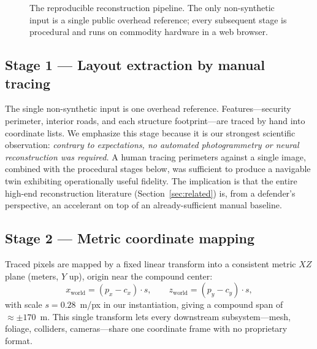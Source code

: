 \documentclass[conference]{IEEEtran}
\begin{document}
\begin{figure}[t]
\centering
{}
\caption{The reproducible reconstruction pipeline. The only non-synthetic input is
a single public overhead reference; every subsequent stage is procedural and
runs on commodity hardware in a web browser.}
\label{fig:pipeline}
\end{figure}

\subsection{Stage 1 --- Layout extraction by manual tracing}
The single non-synthetic input is one overhead reference. Features---security
perimeter, interior roads, and each structure footprint---are traced by hand into
coordinate lists. We emphasize this stage because it is our strongest scientific
observation: \emph{contrary to expectations, no automated photogrammetry or neural
reconstruction was required.} A human tracing perimeters against a single image,
combined with the procedural stages below, was sufficient to produce a navigable
twin exhibiting operationally useful fidelity. The implication is that the entire
high-end reconstruction literature (Section~\ref{sec:related}) is, from a
defender's perspective, an accelerant on top of an already-sufficient manual
baseline.

\subsection{Stage 2 --- Metric coordinate mapping}
Traced pixels are mapped by a fixed linear transform into a consistent metric
$XZ$ plane (meters, $Y$ up), origin near the compound center:
\[
x_{\text{world}} = (p_x - c_x)\cdot s, \qquad
z_{\text{world}} = (p_y - c_y)\cdot s ,
\]
with scale $s = 0.28$~m/px in our instantiation, giving a compound span of
$\approx \pm 170$~m. This single transform lets every downstream subsystem---mesh,
foliage, colliders, cameras---share one coordinate frame with no proprietary
format.
\end{document}
